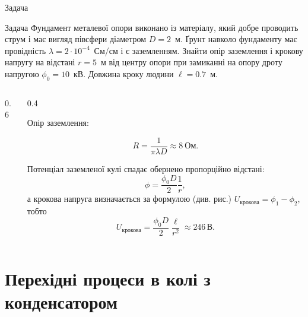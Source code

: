 \documentclass[onlytextwidth]{beamer}
\begin{document}
\begin{frame}{Задача}
	\begin{exampleblock}{Задача}\justifying\small
		Фундамент металевої опори виконано із матеріалу, який добре проводить струм і має вигляд півсфери діаметром $D = 2$~м. Ґрунт
		навколо фундаменту має провідність $\lambda = 2\cdot 10^{-4}$~См/см і є заземленням. Знайти опір заземлення і крокову напругу на відстані $r = 5$~м
		від центру опори при замиканні на опору дроту напругою $\phi_0 = 10$~кВ. Довжина кроку людини $\ell = 0.7$~м.
	\end{exampleblock}
	\begin{columns}
		\begin{column}{0.6\linewidth}
			\begin{center}
				
			\end{center}
		\end{column}
		\begin{column}{0.4\linewidth}
			\begin{block}{}\justifying\small
				Опір заземлення:

				\[
					R = \frac{1}{\pi\lambda D} \approx 8\ \text{Ом}.
				\]

				Потенціал заземленої кулі спадає обернено пропорційно відстані:
				\[
					\phi = \frac{\phi_0 D}{2}\frac{1}{r},
				\]
				а крокова напруга визначається за формулою (див. рис.) $U_\text{крокова} = \phi_1 - \phi_2$, тобто
				\[
					U_\text{крокова} = \frac{\phi_0D}{2}\frac{\ell}{r^2} \approx 246\, \text{В}.
				\]
			\end{block}
		\end{column}
	\end{columns}
\end{frame}


\section{Перехідні процеси в колі з конденсатором}
\end{document}
